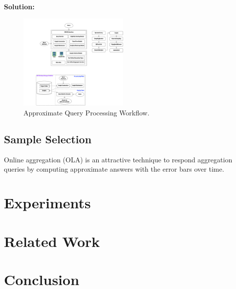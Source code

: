 \documentclass{sig-alternate-05-2015}
\begin{document}
\noindent
\textbf{Solution:}

\begin{figure}[htb]
        \centering
        \includegraphics[width=0.48\textwidth]{workflow.pdf}
        \caption{Approximate Query Processing Workflow.}
        \label{fig:workflow}
\end{figure}

\subsection{Sample Selection}
Online aggregation (OLA) is an attractive technique to respond aggregation queries by computing approximate answers with the error bars over time.
\section{Experiments}

\section{Related Work}


\section{Conclusion}



















































\small{


}
\end{document}

